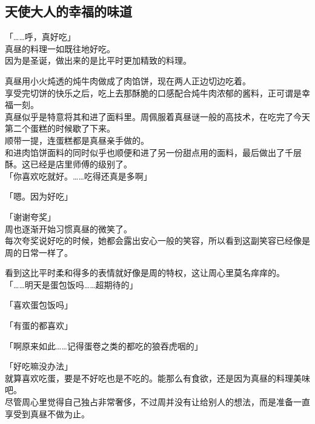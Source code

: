 \subsection{天使大人的幸福的味道}

「……呼，真好吃」\\

真昼的料理一如既往地好吃。\\

因为是圣诞，做出来的是比平时更加精致的料理。

真昼用小火炖透的炖牛肉做成了肉馅饼，现在两人正边切边吃着。\\

享受完切饼的快乐之后，吃上去那酥脆的口感配合炖牛肉浓郁的酱料，正可谓是幸福一刻。\\

真昼似乎是特意将其和进了面料里。周佩服着真昼谜一般的高技术，在吃完了今天第二个蛋糕的时候歇了下来。\\

顺带一提，连蛋糕都是真昼亲手做的。\\

和进肉馅饼面料的同时似乎也顺便和进了另一份甜点用的面料，最后做出了千层酥。这已经是店里师傅的级别了。\\

「你喜欢吃就好。……吃得还真是多啊」

「嗯。因为好吃」

「谢谢夸奖」\\

周也逐渐开始习惯真昼的微笑了。\\

每次夸奖说好吃的时候，她都会露出安心一般的笑容，所以看到这副笑容已经像是周的日常一样了。

看到这比平时柔和得多的表情就好像是周的特权，这让周心里莫名痒痒的。\\

「……明天是蛋包饭吗……超期待的」

「喜欢蛋包饭吗」

「有蛋的都喜欢」

「啊原来如此……记得蛋卷之类的都吃的狼吞虎咽的」

「好吃嘛没办法」\\

就算喜欢吃蛋，要是不好吃也是不吃的。能那么有食欲，还是因为真昼的料理美味吧。\\

尽管周心里觉得自己独占非常奢侈，不过周并没有让给别人的想法，而是准备一直享受到真昼不做为止。\\

